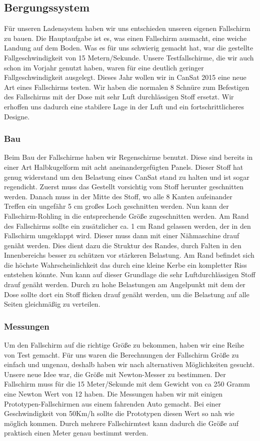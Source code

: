 \subsection{Bergungssystem}
Für unseren Ladensystem haben wir uns entschieden unseren eigenen Fallschirm zu bauen. Die Hauptaufgabe ist es, was einen Fallschirm ausmacht, eine weiche Landung auf dem Boden. Was es für uns schwierig gemacht hat, war die gestellte Fallgeschwindigkeit von 15 Metern/Sekunde. Unsere Testfallschirme, die wir auch schon im Vorjahr genutzt haben, waren für eine deutlich geringer Fallgeschwindigkeit ausgelegt. Dieses Jahr wollen wir in CanSat 2015 eine neue Art eines Fallschirms testen. Wir haben die normalen 8 Schnüre zum Befestigen des Fallschirms mit der Dose mit sehr Luft durchlässigen Stoff ersetzt. Wir erhoffen uns dadurch eine stabilere Lage in der Luft und ein fortschrittlicheres Designe.
	\subsubsection{Bau}
	Beim Bau der Fallschirme haben wir Regenschirme benutzt. Diese sind bereits in einer Art Halbkugelform mit acht aneinandergefügten Panels. Dieser Stoff hat genug widerstand um den Belastung eines CanSat stand zu halten und ist sogar regendicht. Zuerst muss das Gestellt vorsichtig vom Stoff herunter geschnitten werden. Danach muss in der Mitte des Stoff, wo alle 8 Kanten aufeinander Treffen ein ungefähr 5 cm großes Loch geschnitten werden. Nun kann der Fallschirm-Rohling in die entsprechende Größe zugeschnitten werden. Am Rand des Fallschirms sollte ein zusätzlicher ca. 1 cm Rand gelassen werden, der in den Fallschirm umgeklappt wird. Dieser muss dann mit einer Nähmaschine drauf genäht werden. Dies dient dazu die Struktur des Randes, durch Falten in den Innenbereichs besser zu schützen vor stärkeren Belastung. Am Rand befindet sich die höchste Wahrscheinlichkeit das durch eine kleine Kerbe ein kompletter Riss entstehen könnte. Nun kann auf dieser Grundlage die sehr Luftdurchlässigen Stoff drauf genäht werden. Durch zu hohe Belastungen am Angelpunkt mit dem der Dose sollte dort ein Stoff flicken drauf genäht werden, um die Belastung auf alle Seiten gleichmäßig zu verteilen.
	\subsubsection{Messungen}
	Um den Fallschirm auf die richtige Größe zu bekommen, haben wir eine Reihe von Test gemacht. Für uns waren die Berechnungen der Fallschirm Größe zu einfach und ungenau, deshalb haben wir nach alternativen Möglichkeiten gesucht. Unsere neue Idee war, die Größe mit Newton-Messer zu bestimmen. Der Fallschirm muss für die 15 Meter/Sekunde mit dem Gewicht von ca 250 Gramm eine Newton Wert von 12 haben. Die Messungen haben wir mit einigen Prototypen-Fallschirmen aus einem fahrenden Auto gemacht. Bei einer Geschwindigkeit von 50Km/h sollte die Prototypen diesen Wert so nah wie möglich kommen. Durch mehrere Fallschirmtest kann dadurch die Größe auf praktisch einen Meter genau bestimmt werden.  